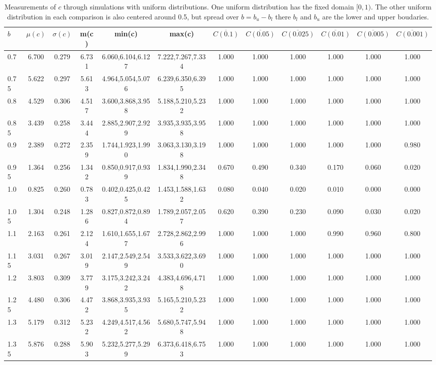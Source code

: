 \begin{table*}[h!]
\begin{center}
\begin{tabular}{| l | c | c | c | c | c | c | c | c | c | c | c |}\hline
$b$ & $\mu(c)$ & $\sigma(c)$ & m(c) & min(c) & max(c) & $\overline{C(0.1)}$ & $\overline{C(0.05)}$ & $\overline{C(0.025)}$ & $\overline{C(0.01)}$ & $\overline{C(0.005)}$ & $\overline{C(0.001)}$ \\\hline
0.7 & 6.700 & 0.279 & 6.731 & 6.060,6.104,6.127 & 7.222,7.267,7.334  & 1.000  & 1.000  & 1.000  & 1.000  & 1.000  & 1.000 \\\hline
0.75 & 5.622 & 0.297 & 5.613 & 4.964,5.054,5.076 & 6.239,6.350,6.395  & 1.000  & 1.000  & 1.000  & 1.000  & 1.000  & 1.000 \\\hline
0.8 & 4.529 & 0.306 & 4.517 & 3.600,3.868,3.958 & 5.188,5.210,5.232  & 1.000  & 1.000  & 1.000  & 1.000  & 1.000  & 1.000 \\\hline
0.85 & 3.439 & 0.258 & 3.444 & 2.885,2.907,2.929 & 3.935,3.935,3.958  & 1.000  & 1.000  & 1.000  & 1.000  & 1.000  & 1.000 \\\hline
0.9 & 2.389 & 0.272 & 2.359 & 1.744,1.923,1.990 & 3.063,3.130,3.198  & 1.000  & 1.000  & 1.000  & 1.000  & 1.000  & 0.980 \\\hline
0.95 & 1.364 & 0.256 & 1.342 & 0.850,0.917,0.939 & 1.834,1.990,2.348  & 0.670  & 0.490  & 0.340  & 0.170  & 0.060  & 0.020 \\\hline
1.0 & 0.825 & 0.260 & 0.783 & 0.402,0.425,0.425 & 1.453,1.588,1.632  & 0.080  & 0.040  & 0.020  & 0.010  & 0.000  & 0.000 \\\hline
1.05 & 1.304 & 0.248 & 1.286 & 0.827,0.872,0.894 & 1.789,2.057,2.057  & 0.620  & 0.390  & 0.230  & 0.090  & 0.030  & 0.020 \\\hline
1.1 & 2.163 & 0.261 & 2.124 & 1.610,1.655,1.677 & 2.728,2.862,2.996  & 1.000  & 1.000  & 1.000  & 0.990  & 0.960  & 0.800 \\\hline
1.15 & 3.031 & 0.267 & 3.019 & 2.147,2.549,2.549 & 3.533,3.622,3.690  & 1.000  & 1.000  & 1.000  & 1.000  & 1.000  & 1.000 \\\hline
1.2 & 3.803 & 0.309 & 3.779 & 3.175,3.242,3.242 & 4.383,4.696,4.718  & 1.000  & 1.000  & 1.000  & 1.000  & 1.000  & 1.000 \\\hline
1.25 & 4.480 & 0.306 & 4.472 & 3.868,3.935,3.935 & 5.165,5.210,5.232  & 1.000  & 1.000  & 1.000  & 1.000  & 1.000  & 1.000 \\\hline
1.3 & 5.179 & 0.312 & 5.232 & 4.249,4.517,4.562 & 5.680,5.747,5.948  & 1.000  & 1.000  & 1.000  & 1.000  & 1.000  & 1.000 \\\hline
1.35 & 5.876 & 0.288 & 5.903 & 5.232,5.277,5.299 & 6.373,6.418,6.753  & 1.000  & 1.000  & 1.000  & 1.000  & 1.000  & 1.000 \\\hline
\end{tabular}
\caption{Measurements of $c$ through simulations
with uniform distributions.
One uniform distribution has the fixed domain $[0,1)$.
The other uniform distribution in each comparison
is also centered around 0.5,
but spread over $b=b_u-b_l$ there $b_l$ and $b_u$ are the lower and upper boudaries.}
\end{center}
\end{table*}